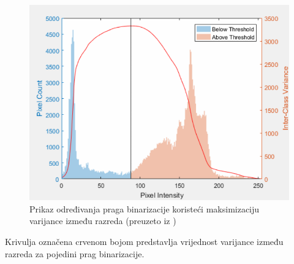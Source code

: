 \documentclass[times, utf8, diplomski]{fer}
\theoremstyle{definition}
\begin{document}
\begin{figure}[h]
\centering
\includegraphics[scale=0.46]{otsu_method.png}
\caption{Prikaz određivanja praga binarizacije koristeći maksimizaciju varijance između razreda (preuzeto iz \cite{ otsu:xxx})}
\end{figure}
Krivulja označena crvenom bojom predstavlja vrijednost varijance između razreda za pojedini prag binarizacije.
\end{document}
